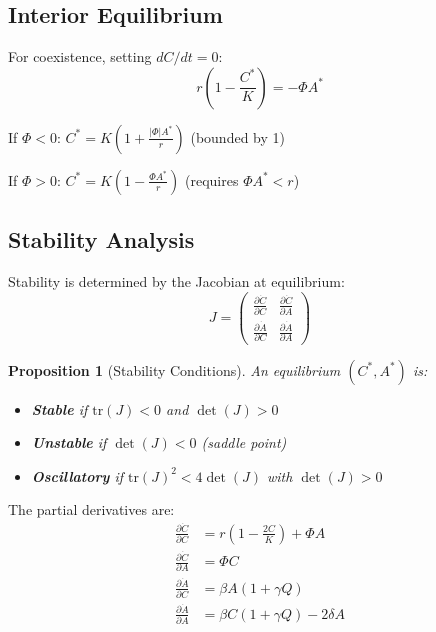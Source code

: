 \documentclass[11pt,a4paper]{article}
\newtheorem{proposition}{Proposition}
\begin{document}
\subsection{Interior Equilibrium}

For coexistence, setting $dC/dt = 0$:
\begin{equation}
r\left(1 - \frac{C^*}{K}\right) = -\Phi A^*
\end{equation}

If $\Phi < 0$: $C^* = K\left(1 + \frac{|\Phi| A^*}{r}\right)$ (bounded by 1)

If $\Phi > 0$: $C^* = K\left(1 - \frac{\Phi A^*}{r}\right)$ (requires $\Phi A^* < r$)

\subsection{Stability Analysis}

Stability is determined by the Jacobian at equilibrium:
\begin{equation}
J = \begin{pmatrix}
\frac{\partial \dot{C}}{\partial C} & \frac{\partial \dot{C}}{\partial A} \\[0.5em]
\frac{\partial \dot{A}}{\partial C} & \frac{\partial \dot{A}}{\partial A}
\end{pmatrix}
\end{equation}

\begin{proposition}[Stability Conditions]
An equilibrium $(C^*, A^*)$ is:
\begin{itemize}
\item \textbf{Stable} if $\text{tr}(J) < 0$ and $\det(J) > 0$
\item \textbf{Unstable} if $\det(J) < 0$ (saddle point)
\item \textbf{Oscillatory} if $\text{tr}(J)^2 < 4\det(J)$ with $\det(J) > 0$
\end{itemize}
\end{proposition}

The partial derivatives are:
\begin{align}
\frac{\partial \dot{C}}{\partial C} &= r\left(1 - \frac{2C}{K}\right) + \Phi A\\
\frac{\partial \dot{C}}{\partial A} &= \Phi C\\
\frac{\partial \dot{A}}{\partial C} &= \beta A(1 + \gamma Q)\\
\frac{\partial \dot{A}}{\partial A} &= \beta C(1 + \gamma Q) - 2\delta A
\end{align}
\end{document}
